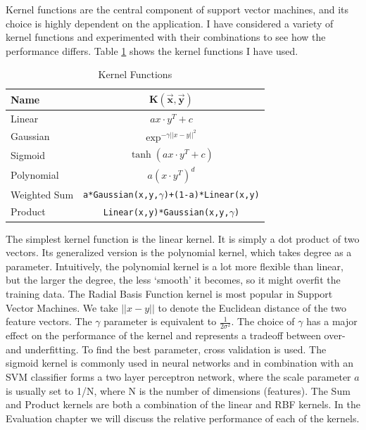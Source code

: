 \documentclass[12pt,notitlepage,twoside]{scrreprt}
\begin{document}
Kernel functions are the central component of support vector machines, and its
choice is highly dependent on the application. I have considered a variety of
kernel functions and experimented with their combinations to see how the
performance differs. Table \ref{kfun} shows the kernel functions I have used.
\begin{table}[h]
\begin{center}
\begin{tabular}{|l|c|}
  \hline
  \textbf{Name} &\( \bm{K(\vec{x},\vec{y})}\)\\
  \hline\hline
  Linear  & \(ax\cdot y^T + c\)\\  
\hline
Gaussian  & \(\exp^{-\gamma ||x-y||^2}\)\\
\hline
Sigmoid   &   \(\tanh(ax \cdot y^T + c)\)\\
\hline
Polynomial& \(a(x\cdot y^T)^d\)  \\
\hline
Weighted Sum&  \texttt{a*Gaussian(x,y,\(\gamma\))+(1-a)*Linear(x,y)}\\
\hline
Product     & \texttt{Linear(x,y)*Gaussian(x,y,\(\gamma\))}\\
\hline
\end{tabular}
\end{center}
\caption{Kernel Functions \label{kfun}}
\end{table}
The simplest kernel function is the linear kernel. It is simply a dot product
of two vectors. Its generalized version is the polynomial kernel, which takes
degree as a parameter. Intuitively, the polynomial kernel is a lot more
flexible than linear, but the larger the degree, the less `smooth' it becomes,
so it might overfit the training data.  The Radial Basis Function kernel is
most popular in Support Vector Machines. We take \(||x-y||\) to denote the
Euclidean distance of the two feature vectors. The \(\gamma\) parameter is
equivalent to \(\frac{1}{2\sigma^2}\). The choice of \(\gamma\) has a major
effect on the performance of the kernel and represents a tradeoff between over-
and underfitting. To find the best parameter, cross validation is used.
 The sigmoid kernel is commonly used in neural networks
and in combination with an SVM classifier forms a two layer perceptron network,
where the scale parameter \(a\) is usually set to 1/N, where N is the number of
dimensions (features)\cite{sigmoid}. The Sum and Product kernels are both a
combination of the linear and RBF kernels. In the Evaluation chapter we will discuss
the relative performance of each of the kernels.
\end{document}
